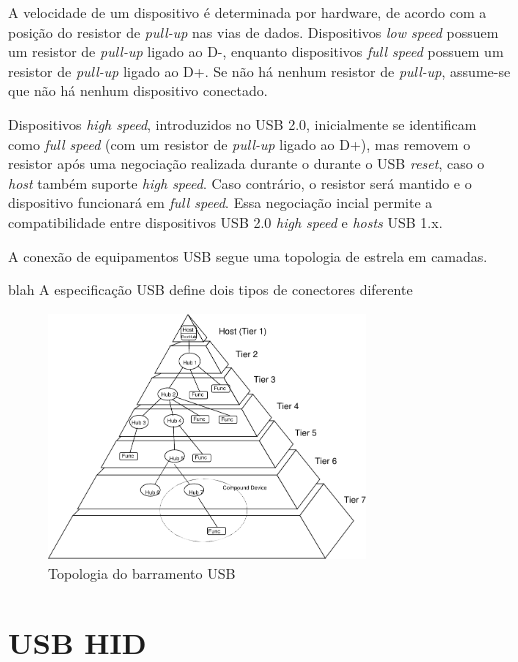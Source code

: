 \documentclass[brazil,pagestart=firstchapter]{abnt}
\begin{document}
A velocidade de um dispositivo é determinada por hardware, de acordo com a
posição do resistor de \textit{pull-up} nas vias de dados. Dispositivos
\textit{low speed} possuem um resistor de \textit{pull-up} ligado ao D-,
enquanto dispositivos \textit{full speed} possuem  um resistor de
\textit{pull-up} ligado ao D+. Se não há nenhum resistor de
\textit{pull-up}, assume-se que não há nenhum dispositivo conectado.
\cite[p.~141]{usb20} \cite[cap.~2]{usbinanutshell}

Dispositivos \textit{high speed}, introduzidos no \ac{USB} 2.0, inicialmente
se identificam como \textit{full speed} (com um resistor de \textit{pull-up}
ligado ao D+), mas removem o resistor após uma negociação realizada durante
o durante o USB \textit{reset}, caso o \textit{host} também suporte
\textit{high speed}.  Caso contrário, o resistor será mantido e o
dispositivo funcionará em \textit{full speed}. Essa negociação incial
permite a compatibilidade entre dispositivos USB 2.0 \textit{high speed} e
\textit{hosts} USB 1.x. \cite[p.~142]{usb20} \cite[cap.~2]{usbinanutshell}

A conexão de equipamentos \ac{USB} segue uma topologia de estrela em
camadas.

blah A especificação \ac{USB} define dois tipos de conectores diferente

\begin{figure}[h]
\centering
\includegraphics[width=0.75\textwidth]{img/usb_bus_topology.pdf}
\caption{Topologia do barramento USB}
\label{fig:usb_topology}
\end{figure}


\section{USB HID\label{sec:usb_hid}}
\end{document}
